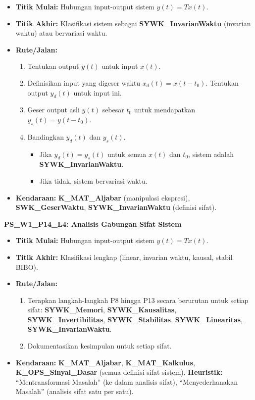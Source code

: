 \documentclass[
  letterpaper,
  DIV=11,
  numbers=noendperiod]{scrreprt}
\providecommand{\tightlist}{%
  \setlength{\itemsep}{0pt}\setlength{\parskip}{0pt}}
\begin{document}
\begin{itemize}
\tightlist
\item
  \textbf{Titik Mulai:} Hubungan input-output sistem \(y(t) = T{x(t)}\).
\item
  \textbf{Titik Akhir:} Klasifikasi sistem sebagai
  \textbf{SYWK\_InvarianWaktu} (invarian waktu) atau bervariasi waktu.
\item
  \textbf{Rute/Jalan:}

  \begin{enumerate}
  \def\labelenumi{\arabic{enumi}.}
  \tightlist
  \item
    Tentukan output \(y(t)\) untuk input \(x(t)\).
  \item
    Definisikan input yang digeser waktu \(x_d(t) = x(t-t_0)\). Tentukan
    output \(y_d(t)\) untuk input ini.
  \item
    Geser output asli \(y(t)\) sebesar \(t_0\) untuk mendapatkan
    \(y_s(t) = y(t-t_0)\).
  \item
    Bandingkan \(y_d(t)\) dan \(y_s(t)\).

    \begin{itemize}
    \tightlist
    \item
      Jika \(y_d(t) = y_s(t)\) untuk semua \(x(t)\) dan \(t_0\), sistem
      adalah \textbf{SYWK\_InvarianWaktu}.
    \item
      Jika tidak, sistem bervariasi waktu.
    \end{itemize}
  \end{enumerate}
\item
  \textbf{Kendaraan:} \textbf{K\_MAT\_Aljabar} (manipulasi ekspresi),
  \textbf{SWK\_GeserWaktu}, \textbf{SYWK\_InvarianWaktu} (definisi
  sifat).
\end{itemize}

\textbf{PS\_W1\_P14\_L4: Analisis Gabungan Sifat Sistem}

\begin{itemize}
\tightlist
\item
  \textbf{Titik Mulai:} Hubungan input-output sistem \(y(t) = T{x(t)}\).
\item
  \textbf{Titik Akhir:} Klasifikasi lengkap (linear, invarian waktu,
  kausal, stabil BIBO).
\item
  \textbf{Rute/Jalan:}

  \begin{enumerate}
  \def\labelenumi{\arabic{enumi}.}
  \tightlist
  \item
    Terapkan langkah-langkah P8 hingga P13 secara berurutan untuk setiap
    sifat: \textbf{SYWK\_Memori}, \textbf{SYWK\_Kausalitas},
    \textbf{SYWK\_Invertibilitas}, \textbf{SYWK\_Stabilitas},
    \textbf{SYWK\_Linearitas}, \textbf{SYWK\_InvarianWaktu}.
  \item
    Dokumentasikan kesimpulan untuk setiap sifat.
  \end{enumerate}
\item
  \textbf{Kendaraan:} \textbf{K\_MAT\_Aljabar},
  \textbf{K\_MAT\_Kalkulus}, \textbf{K\_OPS\_Sinyal\_Dasar} (semua
  definisi sifat sistem). \textbf{Heuristik:} ``Mentransformasi
  Masalah'' (ke dalam analisis sifat), ``Menyederhanakan Masalah''
  (analisis sifat satu per satu).
\end{itemize}
\end{document}
